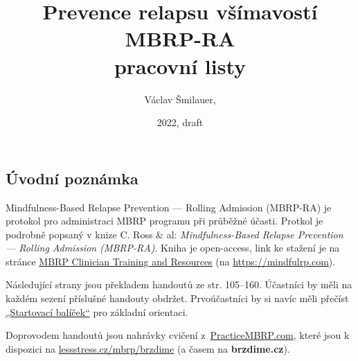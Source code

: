 \documentclass[11pt,a5paper,twoside]{article}
\title{\ifplastex\else\vskip-2cm\fi Prevence relapsu všímavostí\\ MBRP-RA \\ pracovní listy}
\date{2022, draft}
\author{Václav Šmilauer, \lessstressLogo}
\begin{document}
	\maketitle

	\subsection*{Úvodní poznámka}
		Mindfulness-Based Relapse Prevention — Rolling Admission (MBRP-RA) je protokol pro administraci MBRP programu při průběžné účasti. Protkol je podrobně popsaný v knize C. Ross \& al: \emph{Mindfulness-Based Relapse Prevention — Rolling Admission (MBRP-RA)}. Kniha je open-access, link ke stažení je na stránce \href{https://mindfulrp.com/for-clinicians}{MBRP Clinician Training and Resources} (na \url{https://mindfulrp.com}).

		Následující strany jsou překladem handoutů ze str. 105–160. Účastníci by měli na každém sezení příslušné handouty obdržet. Prvoúčastníci by si navíc měli přečíst \href{https://lessstress.cz/mbrp/brzdime/start}{„Startovací balíček“} pro základní orientaci.

		Doprovodem handoutů jsou nahrávky cvičení z~\href{https://practicembrp.com}{PracticeMBRP.com}, které jsou k dispozici na \href{https://lessstress.cz/mbrp/brzdime}{lessstress.cz/mbrp/brzdime} (a časem na \textbf{brzdime.cz}).

	\setlength{\cftbeforesecskip}{1ex}

	\clearpage
	\tableofcontents
	
\end{document}
